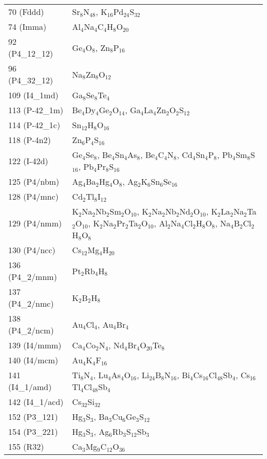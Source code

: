 {\begin{longtable}{p{7.315em}|p{40em}}
    70 (Fddd) & Sr$_{8}$N$_{48}$, K$_{16}$Pd$_{24}$S$_{32}$ \\
    74 (Imma) & Al$_{4}$Na$_{4}$C$_{4}$H$_{8}$O$_{20}$ \\
    92 (P4\_12\_12) & Ge$_{4}$O$_{8}$, Zn$_{8}$P$_{16}$ \\
    96 (P4\_32\_12) & Na$_{8}$Zn$_{8}$O$_{12}$ \\
    109 (I4\_1md) & Ga$_{8}$Se$_{8}$Te$_{4}$ \\
    113 (P-42\_1m) & Be$_{4}$Dy$_{4}$Ge$_{2}$O$_{14}$, Ga$_{4}$La$_{4}$Zn$_{2}$O$_{2}$S$_{12}$ \\
    114 (P-42\_1c) & Sn$_{12}$H$_{8}$O$_{16}$ \\
    118 (P-4n2) & Zn$_{6}$P$_{4}$S$_{16}$ \\
    122 (I-42d) & Ge$_{4}$Se$_{8}$, Be$_{4}$Sn$_{4}$As$_{8}$, Be$_{4}$C$_{4}$N$_{8}$, Cd$_{4}$Sn$_{4}$P$_{8}$, Pb$_{4}$Sm$_{8}$S$_{16}$, Pb$_{4}$Pr$_{8}$S$_{16}$ \\
    125 (P4/nbm) & Ag$_{4}$Ba$_{2}$Hg$_{4}$O$_{8}$, Ag$_{2}$K$_{6}$Sn$_{6}$Se$_{16}$ \\
    128 (P4/mnc) & Cd$_{2}$Tl$_{8}$I$_{12}$ \\
    129 (P4/nmm) & K$_{2}$Na$_{2}$Nb$_{2}$Sm$_{2}$O$_{10}$, K$_{2}$Na$_{2}$Nb$_{2}$Nd$_{2}$O$_{10}$, K$_{2}$La$_{2}$Na$_{2}$Ta$_{2}$O$_{10}$, K$_{2}$Na$_{2}$Pr$_{2}$Ta$_{2}$O$_{10}$, Al$_{2}$Na$_{4}$Cl$_{2}$H$_{8}$O$_{8}$, Na$_{4}$B$_{2}$Cl$_{2}$H$_{8}$O$_{8}$ \\
    130 (P4/ncc) & Cs$_{12}$Mg$_{4}$H$_{20}$ \\
    136 (P4\_2/mnm) & Pt$_{2}$Rb$_{4}$H$_{8}$ \\
    137 (P4\_2/nmc) & K$_{2}$B$_{2}$H$_{8}$ \\
    138 (P4\_2/ncm) & Au$_{4}$Cl$_{4}$, Au$_{4}$Br$_{4}$ \\
    139 (I4/mmm) & Ca$_{4}$Co$_{2}$N$_{4}$, Nd$_{4}$Br$_{4}$O$_{20}$Te$_{8}$ \\
    140 (I4/mcm) & Au$_{4}$K$_{4}$F$_{16}$ \\
    141 (I4\_1/amd) & Ti$_{8}$N$_{4}$, Lu$_{4}$As$_{4}$O$_{16}$, Li$_{24}$B$_{8}$N$_{16}$, Bi$_{4}$Cs$_{16}$Cl$_{48}$Sb$_{4}$, Cs$_{16}$Tl$_{4}$Cl$_{48}$Sb$_{4}$ \\
    142 (I4\_1/acd) & Cs$_{32}$Si$_{32}$ \\
    152 (P3\_121) & Hg$_{3}$S$_{3}$, Ba$_{3}$Cu$_{6}$Ge$_{3}$S$_{12}$ \\
    154 (P3\_221) & Hg$_{3}$S$_{3}$, Ag$_{6}$Rb$_{3}$S$_{12}$Sb$_{3}$ \\
    155 (R32) & Ca$_{3}$Mg$_{9}$C$_{12}$O$_{36}$ \\

\end{longtable}}

